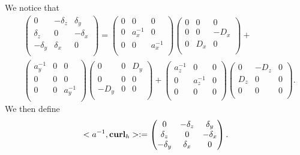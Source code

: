 \documentclass[12pt,reqno]{amsart}
\newcommand{\curl}{{\bf curl}}
\theoremstyle{definition}
\numberwithin{equation}{section}
\begin{document}
		We notice that 
		\begin{align*}
			&
			\begin{pmatrix}
				0& -\delta_z & \delta _y\\
				\delta_z&0&-\delta_x\\
				-\delta_y&\delta_x&0\\
			\end{pmatrix}=
			\begin{pmatrix}
				0& 0 & 0\\
				0&a_x^{-1}&0\\
				0&0&a_x^{-1}\\
			\end{pmatrix}
			\begin{pmatrix}
				0& 0 & 0\\
				0&0&-D_x\\
				0&D_x&0\\
			\end{pmatrix}+\\&
			\begin{pmatrix}
				a_y^{-1}& 0 & 0\\
				0&0&0\\
				0&0&a_y^{-1}\\
			\end{pmatrix}
			\begin{pmatrix}
				0& 0 & D _y\\
				0&0&0\\
				-D_y&0&0\\
			\end{pmatrix}+
			\begin{pmatrix}
				a_z^{-1}& 0 & 0\\
				0&a_z^{-1}&0\\
				0&0&0\\
			\end{pmatrix}
			\begin{pmatrix}
				0& -D_z & 0\\
				D_z&0&0\\
				0&0&0\\
			\end{pmatrix}.
		\end{align*}
		We then define 
		$$
		<a^{-1},\curl_h>:=
		\begin{pmatrix}
			0& -\delta_z & \delta _y\\
			\delta_z&0&-\delta_x\\
			-\delta_y&\delta_x&0\\
		\end{pmatrix}.
		$$
		
\end{document}
